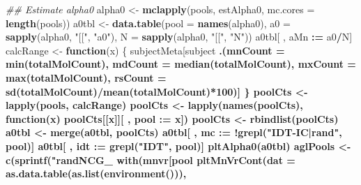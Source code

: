 \documentclass[11pt,letterpaper]{book}
\newenvironment{Shaded}{\begin{snugshade}}{\end{snugshade}}
\newcommand{\CommentTok}[1]{\textcolor[rgb]{0.56,0.35,0.01}{\textit{#1}}}
\newcommand{\ControlFlowTok}[1]{\textcolor[rgb]{0.13,0.29,0.53}{\textbf{#1}}}
\newcommand{\DataTypeTok}[1]{\textcolor[rgb]{0.13,0.29,0.53}{#1}}
\newcommand{\DecValTok}[1]{\textcolor[rgb]{0.00,0.00,0.81}{#1}}
\newcommand{\ErrorTok}[1]{\textcolor[rgb]{0.64,0.00,0.00}{\textbf{#1}}}
\newcommand{\KeywordTok}[1]{\textcolor[rgb]{0.13,0.29,0.53}{\textbf{#1}}}
\newcommand{\NormalTok}[1]{#1}
\newcommand{\OperatorTok}[1]{\textcolor[rgb]{0.81,0.36,0.00}{\textbf{#1}}}
\newcommand{\StringTok}[1]{\textcolor[rgb]{0.31,0.60,0.02}{#1}}
\begin{document}
\begin{Shaded}
\begin{Highlighting}[]
{{{{\CommentTok{## Estimate alpha0}
\NormalTok{alpha0 <-}\StringTok{ }\KeywordTok{mclapply}\NormalTok{(pools, estAlpha0, }\DataTypeTok{mc.cores =} \KeywordTok{length}\NormalTok{(pools))}
\NormalTok{a0tbl <-}\StringTok{ }\KeywordTok{data.table}\NormalTok{(}\DataTypeTok{pool =} \KeywordTok{names}\NormalTok{(alpha0),}
                    \DataTypeTok{a0 =} \KeywordTok{sapply}\NormalTok{(alpha0, }\StringTok{"[["}\NormalTok{, }\StringTok{"a0"}\NormalTok{),}
                    \DataTypeTok{N =} \KeywordTok{sapply}\NormalTok{(alpha0, }\StringTok{"[["}\NormalTok{, }\StringTok{"N"}\NormalTok{))}
\NormalTok{a0tbl[ , aMn }\OperatorTok{:}\ErrorTok{=}\StringTok{ }\NormalTok{a0}\OperatorTok{/}\NormalTok{N]}
\NormalTok{calcRange <-}\StringTok{ }\ControlFlowTok{function}\NormalTok{(x) \{}
\NormalTok{  subjectMeta[subject }\OperatorTok{%in%}\StringTok{ }\NormalTok{x,}
\NormalTok{              .(}\DataTypeTok{mnCount =} \KeywordTok{min}\NormalTok{(totalMolCount),}
                \DataTypeTok{mdCount =} \KeywordTok{median}\NormalTok{(totalMolCount),}
                \DataTypeTok{mxCount =} \KeywordTok{max}\NormalTok{(totalMolCount),}
                \DataTypeTok{rsCount =} \KeywordTok{sd}\NormalTok{(totalMolCount)}\OperatorTok{/}\KeywordTok{mean}\NormalTok{(totalMolCount)}\OperatorTok{*}\DecValTok{100}\NormalTok{)]}
\NormalTok{\}}
\NormalTok{poolCts <-}\StringTok{ }\KeywordTok{lapply}\NormalTok{(pools, calcRange)}
\NormalTok{poolCts <-}\StringTok{ }\KeywordTok{lapply}\NormalTok{(}\KeywordTok{names}\NormalTok{(poolCts), }\ControlFlowTok{function}\NormalTok{(x) poolCts[[x]][ , }\DataTypeTok{pool :=}\NormalTok{ x])}
\NormalTok{poolCts <-}\StringTok{ }\KeywordTok{rbindlist}\NormalTok{(poolCts)}
\NormalTok{a0tbl <-}\StringTok{ }\KeywordTok{merge}\NormalTok{(a0tbl, poolCts)}
\NormalTok{a0tbl[ , mc }\OperatorTok{:}\ErrorTok{=}\StringTok{ }\OperatorTok{!}\KeywordTok{grepl}\NormalTok{(}\StringTok{"IDT-IC|rand"}\NormalTok{, pool)]}
\NormalTok{a0tbl[ , idt }\OperatorTok{:}\ErrorTok{=}\StringTok{ }\KeywordTok{grepl}\NormalTok{(}\StringTok{"IDT"}\NormalTok{, pool)]}
\KeywordTok{pltAlpha0}\NormalTok{(a0tbl)}
\NormalTok{aglPools <-}\StringTok{ }\KeywordTok{c}\NormalTok{(}\KeywordTok{sprintf}\NormalTok{(}\StringTok{"randNCG_%d"}\NormalTok{, }\DecValTok{1}\OperatorTok{:}\DecValTok{5}\NormalTok{), }\StringTok{"Pool1"}\NormalTok{, }\StringTok{"Pool2"}\NormalTok{, }\StringTok{"WGS"}\NormalTok{, }\StringTok{"SMA1"}\NormalTok{, }\StringTok{"SMA2"}\NormalTok{)}
\KeywordTok{with}\NormalTok{(mnvr[pool }\OperatorTok{%in%}\StringTok{ }\NormalTok{aglPools], \{}
  \KeywordTok{pltMnVrCont}\NormalTok{(}\DataTypeTok{dat =} \KeywordTok{as.data.table}\NormalTok{(}\KeywordTok{as.list}\NormalTok{(}\KeywordTok{environment}\NormalTok{())),}
}}}}}}}
\end{Highlighting}
\end{Shaded}
\end{document}
